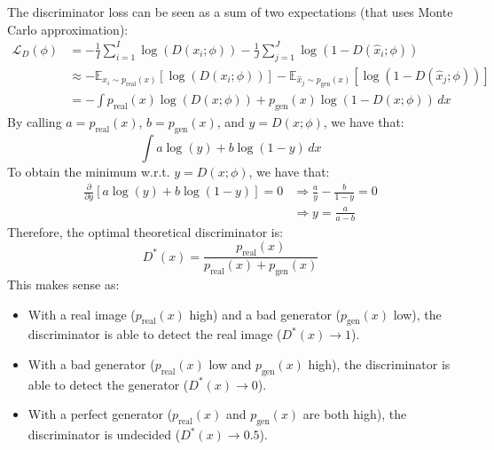 \begin{description}
        \begin{remark}
            The discriminator loss can be seen as a sum of two expectations (that uses Monte Carlo approximation):
            \[ 
                \begin{split}
                    \mathcal{L}_D(\phi) &= - \frac{1}{I} \sum_{i=1}^{I} \log(D(x_i; \phi)) - \frac{1}{J} \sum_{j=1}^{J} \log(1-D(\hat{x}_i; \phi)) \\
                    &\approx -\mathbb{E}_{x_i \sim p_\text{real}(x)}\left[ \log(D(x_i; \phi)) \right] - \mathbb{E}_{\hat{x}_j \sim p_\text{gen}(x)}\left[ \log(1-D(\hat{x}_j; \phi)) \right] \\
                    &= - \int p_\text{real}(x) \log(D(x; \phi)) + p_\text{gen}(x) \log(1-D(x; \phi)) \,dx
                \end{split}
            \]
            By calling $a = p_\text{real}(x)$, $b = p_\text{gen}(x)$, and $y = D(x; \phi)$, we have that:
            \[ \int a \log(y) + b \log(1-y) \,dx \]
            To obtain the minimum w.r.t. $y = D(x; \phi)$, we have that:
            \[ 
                \begin{split}
                    \frac{\partial}{\partial y}\left[ a \log(y) + b \log(1-y) \right] = 0 
                    &\Rightarrow \frac{a}{y} - \frac{b}{1-y} = 0 \\
                    &\Rightarrow y = \frac{a}{a-b}
                \end{split}
            \]
            Therefore, the optimal theoretical discriminator is:
            \[ D^*(x) = \frac{p_\text{real}(x)}{p_\text{real}(x) + p_\text{gen}(x)} \]
            This makes sense as:
            \begin{itemize}
                \item With a real image ($p_\text{real}(x)$ high) and a bad generator ($p_\text{gen}(x)$ low), the discriminator is able to detect the real image ($D^*(x) \rightarrow 1$).
                \item With a bad generator ($p_\text{real}(x)$ low and $p_\text{gen}(x)$ high), the discriminator is able to detect the generator ($D^*(x) \rightarrow 0$).
                \item With a perfect generator ($p_\text{real}(x)$ and $p_\text{gen}(x)$ are both high), the discriminator is undecided ($D^*(x) \rightarrow 0.5$).
            \end{itemize}
        \end{remark}


\end{description}
